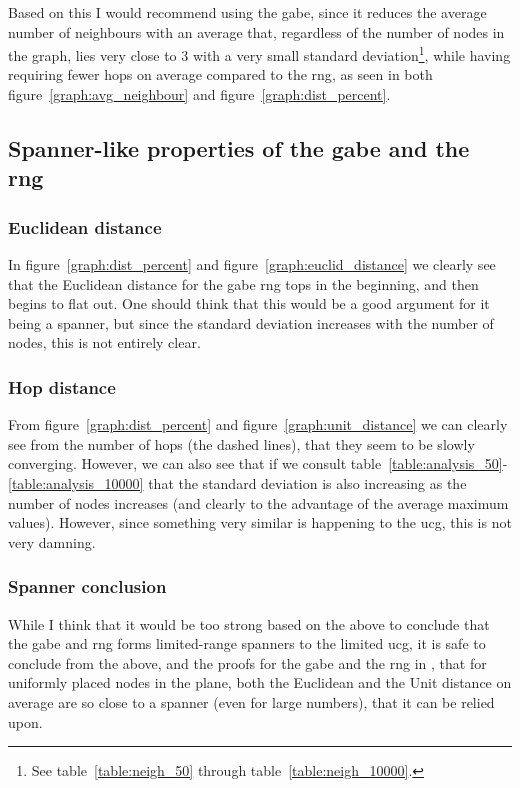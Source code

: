 Based on this I would recommend using the \ac{gabe}, since it reduces the average number of neighbours with an average that, regardless of the number of nodes in the graph, lies very close to 3 with a very small standard deviation\footnote{See table~\ref{table:neigh_50} through table~\ref{table:neigh_10000}.}, while having requiring fewer hops on average compared to the \ac{rng}, as seen in both figure~\ref{graph:avg_neighbour} and figure~\ref{graph:dist_percent}.

\subsection{Spanner-like properties of the \ac{gabe} and the \ac{rng}}

\subsubsection{Euclidean distance}

In figure~\ref{graph:dist_percent} and figure~\ref{graph:euclid_distance} we clearly see that the Euclidean distance for the \ac{gabe} \ac{rng} tops in the beginning, and then begins to flat out. One should think that this would be a good argument for it being a spanner, but since the standard deviation increases with the number of nodes, this is not entirely clear.

\subsubsection{Hop distance}


From figure~\ref{graph:dist_percent} and figure~\ref{graph:unit_distance} we can clearly see from the number of hops (the dashed lines), that they seem to be slowly converging. However, we can also see that if we consult table~\ref{table:analysis_50}-\ref{table:analysis_10000} that the standard deviation is also increasing as the number of nodes increases (and clearly to the advantage of the average maximum values). However, since something very similar is happening to the \ac{ucg}, this is not very damning.

\subsubsection{Spanner conclusion}

While I think that it would be too strong based on the above to conclude that the \ac{gabe} and \ac{rng} forms limited-range spanners to the limited \ac{ucg}, it is safe to conclude from the above, and the proofs for the \ac{gabe} and the \ac{rng} in \cite{spanningGG_RNG}, that for uniformly placed nodes in the plane, both the Euclidean and the Unit distance on average are so close to a spanner (even for large numbers), that it can be relied upon.
